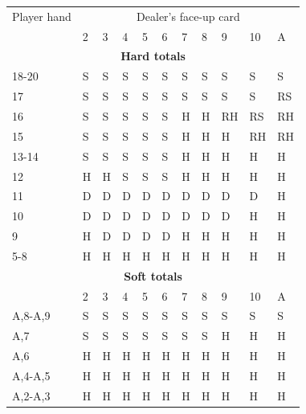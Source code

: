 \documentclass[conference]{IEEEtran}
\begin{document}
\begin{table}[ht]
\tiny
\centering
\begin{tabular}{|l|l|l|l|l|l|l|l|l|l|l|}
\hline

{Player hand} & \multicolumn{10}{c|}{Dealer's face-up card}     \\ \cline{2-11} 
                             & 2 & 3 & 4 & 5 & 6 & 7 & 8 & 9 & 10 & A \\ \hline
\multicolumn{11}{|c|}{\textbf{Hard totals}}                           \\ \hline
18-20       								 & S & S & S & S & S & S & S & S & S & S  \\ \hline
17                           & S & S & S & S & S & S & S & S & S & RS  \\ \hline
16                           & S & S & S & S & S & H & H & RH & RS & RH  \\ \hline
15                           & S & S & S & S & S & H & H & H & RH & RH  \\ \hline
13-14                        & S & S & S & S & S & H & H & H & H & H  \\ \hline
12                           & H & H & S & S & S & H & H & H & H & H  \\ \hline
11                           & D & D & D & D & D & D & D & D & D & H  \\ \hline
10                           & D & D & D & D & D & D & D & D & H & H  \\ \hline
9                            & H & D & D & D & D & H & H & H & H & H  \\ \hline
5-8                          & H & H & H & H & H & H & H & H & H & H  \\ \hline

\multicolumn{11}{|c|}{\textbf{Soft totals}}                           \\ \hline
                             & 2 & 3 & 4 & 5 & 6 & 7 & 8 & 9 & 10 & A \\ \hline
A,8-A,9                      & S & S & S & S & S & S & S & S & S & S  \\ \hline
A,7                          & S & S & S & S & S & S & S & H & H & H  \\ \hline
A,6                          & H & H & H & H & H & H & H & H & H & H  \\ \hline
A,4-A,5                      & H & H & H & H & H & H & H & H & H & H  \\ \hline
A,2-A,3                      & H & H & H & H & H & H & H & H & H & H  \\ \hline


\end{tabular}
\end{table}
\end{document}
